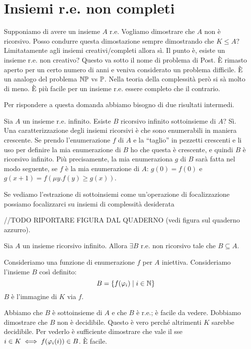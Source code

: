 \section{Insiemi r.e. non completi}

Supponiamo di avere un insieme $A$ r.e. Vogliamo dimostrare che $A$ non è ricorsivo. Posso condurre
questa dimostazione sempre dimostrando che $K \leq A$? Limitatamente agli insiemi creativi/completi
allora sì. Il punto è, esiste un insieme r.e. non creativo? Questo va sotto il nome di problema di
Post. È rimasto aperto per un certo numero di anni e veniva considerato un problema difficile.  È
un analogo del problema $\mathbb{NP}$ vs $\mathbb{P}$. Nella teoria della complessità però si sà molto di meno. È più
facile per un insieme r.e. essere completo che il contrario.

Per rispondere a questa domanda abbiamo bisogno di due risultati intermedi.

Sia $A$ un insieme r.e. infinito. Esiste $B$ ricorsivo infinito sottoinsieme di $A$? Sì. Una
caratterizzazione degli insiemi ricorsivi è che sono enumerabili in maniera crescente. Se prendo
l'enumerazione $f$ di $A$ e la ``taglio'' in pezzetti crescenti e li uso per definire la mia
enumerazione di $B$ ho che questa è crescente, e quindi $B$ è ricorsivo infinito. Più
precisamente, la mia enumeraziona $g$ di $B$ sarà fatta nel modo seguente, se $f$ è la mia
enumerazione di $A$: $g(0) = f(0)$ e $g(x+1) = f(\mu y. f(y) \geq g(x))$.


Se vediamo l'estrazione di sottoinsiemi come un'operazione di focalizzazione possiamo focalizzarci
su insiemi di complessità desiderata 

//TODO RIPORTARE FIGURA DAL QUADERNO
(vedi figura sul quaderno azzurro).

Sia $A$ un insieme ricorsivo infinito. Allora $\exists B$ r.e. non ricorsivo tale che $B \subseteq
A$.

Consideriamo una funzione di enumerazione $f$ per $A$ iniettiva. Consideriamo l'insieme $B$ così
definito:
\begin{equation*}
    B = \{f(\varphi_{i}) \mid i \in \mathbb{N}\}
\end{equation*}
$B$  è l'immagine di $K$ via $f$.

Abbiamo che $B$ è sottoinsieme di $A$ e che $B$ è r.e.; è facile da vedere. Dobbiamo dimostrare
che $B$ non è decidibile. Questo è vero perché altrimenti $K$ sarebbe decidibile. Per vederlo è
sufficiente dimostrare che vale il sse $i \in K \iff f(\varphi_{i}(i)) \in B$. È facile.

